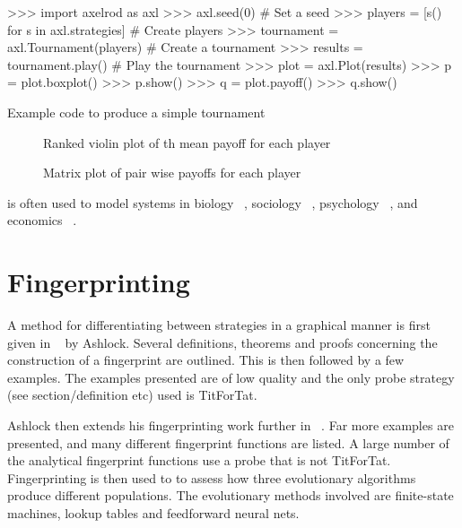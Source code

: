 \begin{listing}[htbp!]
\begin{ExampleCode}
>>> import axelrod as axl
>>> axl.seed(0)  # Set a seed
>>> players = [s() for s in axl.strategies]  # Create players
>>> tournament = axl.Tournament(players)  # Create a tournament
>>> results = tournament.play()  # Play the tournament
>>> plot = axl.Plot(results)
>>> p = plot.boxplot()
>>> p.show()
>>> q = plot.payoff()
>>> q.show()
\end{ExampleCode}
\caption{Example code to produce a simple tournament}
\label{lst:tournament}
\end{listing}

\begin{figure}
\begin{center}
\caption{Ranked violin plot of th mean payoff for each player}
\label{fig:violinplot}
\end{center}

\begin{center}
\caption{Matrix plot of pair wise payoffs for each player}
\label{fig:matrixplot}
\end{center}
\end{figure}

is often used to model systems in biology ~\cite{Sigmund1999}, sociology ~\cite{Franken2005},
psychology ~\cite{Ishibuchi2005}, and economics ~\cite{Chong2005}.


\section{Fingerprinting}\label{sec:fingerprinting}

A method for differentiating between strategies in a graphical manner is first given in ~\cite{Ashlock2004} by Ashlock.
Several definitions, theorems and proofs concerning the construction of a fingerprint are outlined.
This is then followed by a few examples.
The examples presented are of low quality and the only probe strategy (see section/definition etc) used is TitForTat.

Ashlock then extends his fingerprinting work further in ~\cite{Ashlock2008}.
Far more examples are presented, and many different fingerprint functions are listed.
A large number of the analytical fingerprint functions use a probe that is not TitForTat.
Fingerprinting is then used to to assess how three evolutionary algorithms produce different populations.
The evolutionary methods involved are finite-state machines, lookup tables and feedforward neural nets.


